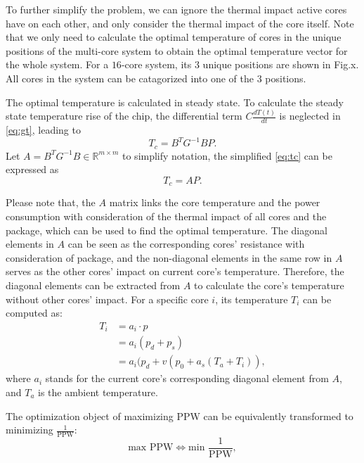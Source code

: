 To further simplify the problem, we can ignore the thermal impact active cores have on each other, and only consider the thermal impact of the core itself. Note that we only need to calculate the optimal temperature of cores in the unique positions of the multi-core system to obtain the optimal temperature vector for the whole system. For a $16$-core system, its $3$ unique positions are shown in Fig.x. All cores in the system can be catagorized into one of the $3$ positions.

The optimal temperature is calculated in steady state. To calculate the steady state temperature rise of the chip, the differential term $C\frac{dT(t)}{dt}$ is neglected in 
\eqref{eq:gt}, leading to
\begin{equation}\label{eq:tc}
T_{c} = B^{T}G^{-1}BP.
\end{equation}
Let $A = B^{T}G^{-1}B \in \mathbb{R}^{m \times m}$ to simplify notation, the simplified 
\eqref{eq:tc} can be expressed as
\begin{equation}\label{sim_tc}
T_{c} = AP.
\end{equation}

Please note that, the $A$ matrix links the core temperature and the power consumption with consideration of the thermal impact of all cores and the package, which can be used to find the optimal temperature. The diagonal elements in $A$ can be seen as the corresponding cores' resistance with consideration of package, and the non-diagonal elements in the same row in $A$ serves as the other cores' impact on current core's temperature. Therefore, the diagonal elements can be extracted from $A$ to calculate the core's temperature without other cores' impact. For a specific core $i$, its temperature $T_{i}$ can be computed as:
\begin{equation}\label{eq:t_ap}
\begin{split}
T_{i}&=a_{i} \cdot p\\
&=a_{i}(p_{d}+p_{s})\\
&=a_{i}(p_{d}+v (p_{0}+a_{s}(T_{a}+T_{i})),
\end{split}
\end{equation}
where $a_{i}$ stands for the current core's corresponding diagonal element from $A$, and $T_{a}$ is the ambient temperature.

The optimization object of maximizing PPW can be equivalently transformed to minimizing $\frac{1}{\text{PPW}}$:
\begin{equation}\label{eq:min_ppw}
\text{max PPW}\Longleftrightarrow \text{min } \frac{1}{\text{PPW}},
\end{equation}

